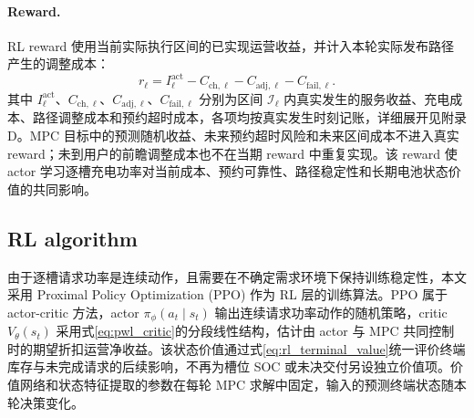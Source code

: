 \documentclass[12pt,a4paper,UTF8]{ctexart}
\begin{document}
\paragraph{Reward.}
RL reward 使用当前实际执行区间的已实现运营收益，并计入本轮实际发布路径产生的调整成本：
\begin{equation}
r_\ell
=
I_\ell^{\mathrm{act}}
-C_{\mathrm{ch},\ell}
-C_{\mathrm{adj},\ell}
-C_{\mathrm{fail},\ell}.
\label{eq:rl_reward}
\end{equation}
其中 $I_\ell^{\mathrm{act}}$、$C_{\mathrm{ch},\ell}$、$C_{\mathrm{adj},\ell}$、$C_{\mathrm{fail},\ell}$ 分别为区间 $\mathcal I_\ell$ 内真实发生的服务收益、充电成本、路径调整成本和预约超时成本，各项均按真实发生时刻记账，详细展开见附录 D。MPC 目标中的预测随机收益、未来预约超时风险和未来区间成本不进入真实 reward；未到用户的前瞻调整成本也不在当期 reward 中重复实现。该 reward 使 actor 学习逐槽充电功率对当前成本、预约可靠性、路径稳定性和长期电池状态价值的共同影响。


\subsection{RL algorithm}

由于逐槽请求功率是连续动作，且需要在不确定需求环境下保持训练稳定性，本文采用 Proximal Policy Optimization (PPO) 作为 RL 层的训练算法。PPO 属于 actor-critic 方法，actor $\pi_{\phi}(a_t\mid s_t)$ 输出连续请求功率动作的随机策略，critic $V_{\theta}(s_t)$ 采用式\eqref{eq:pwl_critic}的分段线性结构，估计由 actor 与 MPC 共同控制时的期望折扣运营净收益。该状态价值通过式\eqref{eq:rl_terminal_value}统一评价终端库存与未完成请求的后续影响，不再为槽位 SOC 或未决交付另设独立价值项。价值网络和状态特征提取的参数在每轮 MPC 求解中固定，输入的预测终端状态随本轮决策变化。
\end{document}
